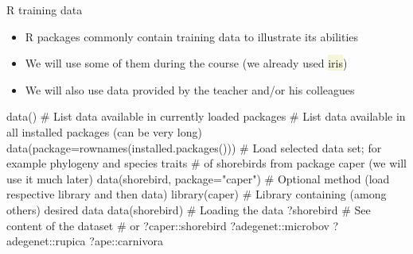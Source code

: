 \documentclass[compress, xelatex, 11pt, xcolor=svgnames, aspectratio=169,
	hyperref={
		bookmarks=true,
		unicode=true,
		colorlinks=true,
		pdftitle={Molecular data in R},
		plainpages=false,
		pdfauthor={Vojtech Zeisek},
		pdfsubject={Course about phylogeny and evolution in R},
		pdfcreator={XeLaTeX},
		pdfkeywords={R, evolution, phylogeny, molecular data},
		linkcolor=Crimson, %
		anchorcolor=Magenta, %
		citecolor=Magenta, %
		filecolor=Magenta, %
		menucolor=Magenta, %
		urlcolor=DodgerBlue, %
		},
	url={hyphens, lowtilde} %
	]{beamer}
\renewcommand{\texttt}[1]{\colorbox{Beige}{{\ttfamily #1}}}
\begin{document}
\begin{frame}[fragile]{R training data}
	\begin{itemize}
		\item R packages commonly contain training data to illustrate its abilities
		\item We will use some of them during the course (we already used \texttt{iris})
		\item We will also use data provided by the teacher and/or his colleagues
	\end{itemize}
	\begin{spluscode}
    data() # List data available in currently loaded packages
    # List data available in all installed packages (can be very long)
    data(package=rownames(installed.packages()))
    # Load selected data set; for example phylogeny and species traits
    # of shorebirds from package caper (we will use it much later)
    data(shorebird, package="caper")
    # Optional method (load respective library and then data)
    library(caper) # Library containing (among others) desired data
    data(shorebird) # Loading the data
    ?shorebird # See content of the dataset # or ?caper::shorebird
    ?adegenet::microbov
    ?adegenet::rupica
    ?ape::carnivora
	\end{spluscode}
\end{frame}
\end{document}
